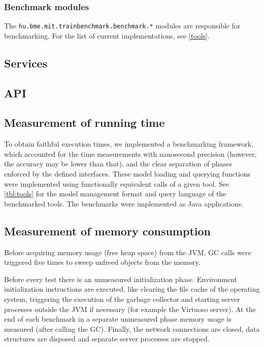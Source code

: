\subsubsection{Benchmark modules}

The \texttt{hu.bme.mit.trainbenchmark.benchmark.*} modules are responsible for benchmarking. For the list of current implementations, see \autoref{tools}.


\subsection{Services}

\subsection{API}

\subsection{Measurement of running time}

To obtain faithful execution times, we implemented a benchmarking framework,
which accounted for the time measurements with nanosecond precision (however, the accuracy may be lower than that),
 and the clear separation of phases enforced by the defined
interfaces. These model loading and querying functions were implemented using
functionally equivalent calls of a given tool. See \autoref{tbl:tools} for
the model management format and query language of the benchmarked tools. The
benchmarks were implemented as Java applications.

\subsection{Measurement of memory consumption}
Before acquiring memory usage (free heap space) from the JVM, GC calls were triggered five times to sweep unfreed objects from the memory.

Before every test
there is an unmeasured initialization phase. Environment initialization
instructions are executed, like clearing the file cache of the operating system, triggering the
execution of the garbage collector and starting server processes outside the
JVM if necessary (for example the Virtuoso server). At the end of each benchmark
in a separate unmeasured phase memory usage is measured (after calling the GC).
Finally, the network connections are closed, data structures are disposed and
separate server processes are stopped.


